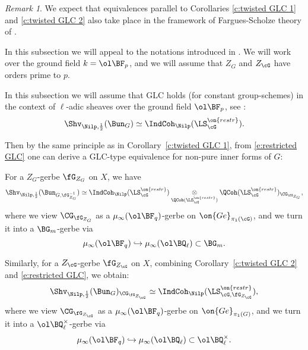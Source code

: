 \documentclass[9pt]{amsart}
\theoremstyle{remark}
\newtheorem{rem}[subsubsection]{Remark}
\theoremstyle{definition}
\theoremstyle{remark}
\newcommand{\corref}[1]{Corollary~\ref{#1}}
\numberwithin{equation}{section}
\begin{document}
\begin{rem}

We expect that equivalences parallel to Corollaries \ref{c:twisted GLC 1} and \ref{c:twisted GLC 2} 
also take place in the framework of Fargues-Scholze theory of \cite{FS}.

\end{rem}


In this subsection we will appeal to the notations introduced in \cite[Sect. 24]{AGKRRV}. We will work
over the ground field $k=\ol\BF_p$, and we will assume that $Z_G$ and $Z_\cG$ have orders prime to $p$. 

\sssec{}

In this subsection we will assume that GLC holds (for constant group-schemes) in the context of $\ell$-adic sheaves
over the ground field $\ol\BF_p$, see \cite[Conjecture 21.2.7]{AGKRRV}:
\begin{equation} \label{e:restricted GLC}
\Shv_{\Nilp,\frac{1}{2}}(\Bun_G)\simeq \IndCoh_\Nilp(\LS_\cG^{\on{restr}}).
\end{equation} 

Then by the same principle as in \corref{c:twisted GLC 1}, from \eqref{e:restricted GLC} one can derive a 
GLC-type equivalence for non-pure inner forms of $G$:

\medskip

For a $Z_G$-gerbe $\fG_{Z_G}$ on $X$, we have 
\begin{equation} \label{e:restricted GLC 1}
\Shv_{\Nilp,\frac{1}{2}}(\Bun_{G,\fG^{-1}_{Z_G}}) \simeq \IndCoh_\Nilp(\LS^{\on{restr}}_\cG)
\underset{\QCoh(\LS^{\on{restr}}_\cG)}\otimes \QCoh(\LS^{\on{restr}}_\cG)_{\CG_{\fG_{Z_G}}},
\end{equation}
where we view $\CG_{\fG_{Z_G}}$ as a $\mu_\infty(\ol\BF_q)$-gerbe on $\on{Ge}_{\pi_1(\cG)}$, and we turn it into a $\BG_m$-gerbe 
via
$$\mu_\infty(\ol\BF_q)\hookrightarrow \mu_\infty(\ol\BQ_\ell)\subset \BG_m.$$

\sssec{}

Similarly, for a $Z_\cG$-gerbe $\fG_{Z_{\cG}}$ on $X$, combining \corref{c:twisted GLC 2} and \eqref{e:restricted GLC}, we obtain:
\begin{equation} \label{e:restricted GLC 2}
\Shv_{\Nilp,\frac{1}{2}}(\Bun_G)_{\CG_{\fG_{Z_{\cG}}}} \simeq \IndCoh_\Nilp(\LS^{\on{restr}}_{\cG,\fG_{Z_{\cG}}}),
\end{equation}
where we view $\CG_{\fG_{Z_{\cG}}}$ as a $\mu_\infty(\ol\BF_q)$-gerbe on $\on{Ge}_{\pi_1(G)}$, and we turn it into a $\ol\BQ_\ell^\times$-gerbe via
\begin{equation} \label{e:roots of unity}
\mu_\infty(\ol\BF_q)\hookrightarrow \mu_\infty(\ol\BQ_\ell)\subset \ol\BQ_\ell^\times.
\end{equation} 
\end{document}
